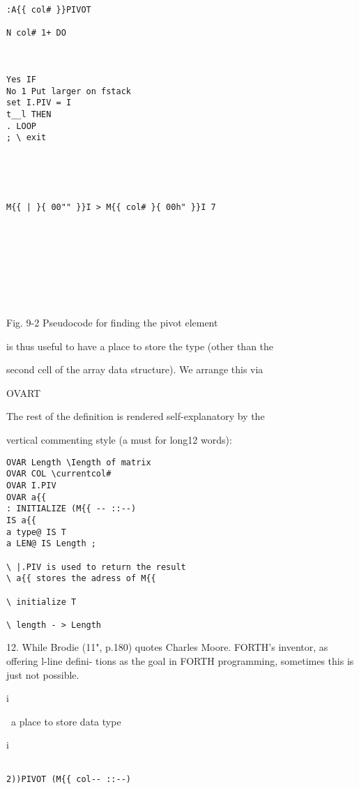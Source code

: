 {{{%



 

\begin{verbatim}
:A{{ col# }}PIVOT

N col# 1+ DO

 

Yes IF
No 1 Put larger on fstack
set I.PIV = I
t__l THEN
. LOOP
; \ exit

 

 

M{{ | }{ 00"" }}I > M{{ col# }{ 00h" }}I 7

 

 

 

 
\end{verbatim}

Fig. 9-2 Pseudocode for finding the pivot element

is thus useful to have a place to store the type (other than the

second cell of the array data structure). We arrange this via

OVART

The rest of the definition is rendered self-explanatory by the

vertical commenting style (a must for long12 words):
\begin{verbatim}
OVAR Length \Iength of matrix
OVAR COL \currentcol#
OVAR I.PIV
OVAR a{{
: INITIALIZE (M{{ -- ::--)
IS a{{
a type@ IS T
a LEN@ IS Length ;

\ |.PIV is used to return the result
\ a{{ stores the adress of M{{

\ initialize T

\ length - > Length

\end{verbatim} 

12. While Brodie (11", p.180) quotes Charles Moore. FORTH's inventor, as offering l-line defini-
tions as the goal in FORTH programming, sometimes this is just not possible.

i

\ a place to store data type

i

 



\begin{verbatim}

2))PIVOT (M{{ col-- ::--)


\end{verbatim}}}}
